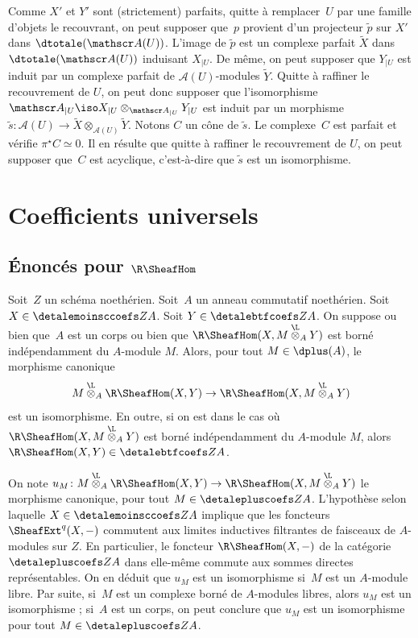 \documentclass[10pt]{../fichiers-configuration-latex/smfart}
\begin{document}
Comme $X'$ et $Y'$ sont (strictement) parfaits, quitte à remplacer $U$ par
une famille d'objets le recouvrant, on peut supposer que $p$ provient d'un
projecteur $\tilde p$ sur $X'$ dans $\dtotale(\mathscr A(U))$. L'image de
$\tilde p$ est un complexe parfait $\tilde X$ dans $\dtotale(\mathscr
A(U))$ induisant $X_{|U}$. De même, on peut supposer que $Y_{|U}$ est induit
par un complexe parfait de $\mathscr A(U)$-modules $\tilde Y$. Quitte à
raffiner le recouvrement de $U$, on peut donc supposer que l'isomorphisme
$\mathscr A_{|U}\iso X_{|U}\otimes_{\mathscr A_{|U}}Y_{|U}$ est induit
par un morphisme $\tilde s\colon \mathscr A(U)\to
\tilde X\otimes_{\mathscr A(U)}\tilde Y$. Notons
$C$ un cône de $\tilde s$. Le complexe $C$ est parfait et vérifie
$\pi^\star C\simeq 0$. Il en résulte que quitte à raffiner le recouvrement
de $U$, on peut supposer que $C$ est acyclique, c'est-à-dire que $\tilde s$
est un isomorphisme.

\section{Coefficients universels}%
\subsection{Énoncés pour \texorpdfstring{$\R\SheafHom$}{RHom}}%

\begin{proposition2}\label{17-proposition-coefficients-universels-1}
Soit $Z$ un schéma noethérien. Soit $A$ un anneau commutatif noethérien.
Soit $X\in \detalemoinsccoefs Z A$. Soit $Y\in\detalebtfcoefs Z A$. On suppose ou
bien que $A$ est un corps ou bien que
$\R\SheafHom(X,M\overset{\L}{\otimes}_{A} Y)$ est borné
indépendamment du $A$-module $M$. Alors, pour tout $M\in\dplus(A)$, le
morphisme canonique
\[M\overset{\L}{\otimes}_A \R\SheafHom(X,Y)\to
\R\SheafHom(X,M\overset{\L}{\otimes}_A Y)\]
est un isomorphisme. En outre, si on est dans le cas où
$\R\SheafHom(X,M\overset{\L}{\otimes}_{A} Y)$ est borné
indépendamment du $A$-module $M$, alors
$\R\SheafHom(X,Y)\in\detalebtfcoefs Z A$.
\end{proposition2}

On note $u_M\colon M\overset{\L}{\otimes}_A \R\SheafHom(X,Y)\to
\R\SheafHom(X,M\overset{\L}{\otimes}_A Y)$ le morphisme
canonique, pour tout $M\in\detalepluscoefs Z A$. L'hypothèse selon laquelle
$X\in\detalemoinsccoefs Z A$ implique que les foncteurs $\SheafExt^q(X,-)$
commutent aux limites inductives filtrantes de faisceaux de $A$-modules sur
$Z$. En particulier, le foncteur $\R\SheafHom(X,-)$ de la catégorie
$\detalepluscoefs Z A$ dans elle-même commute aux sommes directes
représentables. On en déduit que $u_M$ est un isomorphisme si $M$ est un
$A$-module libre. Par suite, si $M$ est un complexe borné de $A$-modules
libres, alors $u_M$ est un isomorphisme ; si $A$ est un corps, on peut
conclure que $u_M$ est un isomorphisme pour tout $M\in \detalepluscoefs Z A$.
\end{document}
